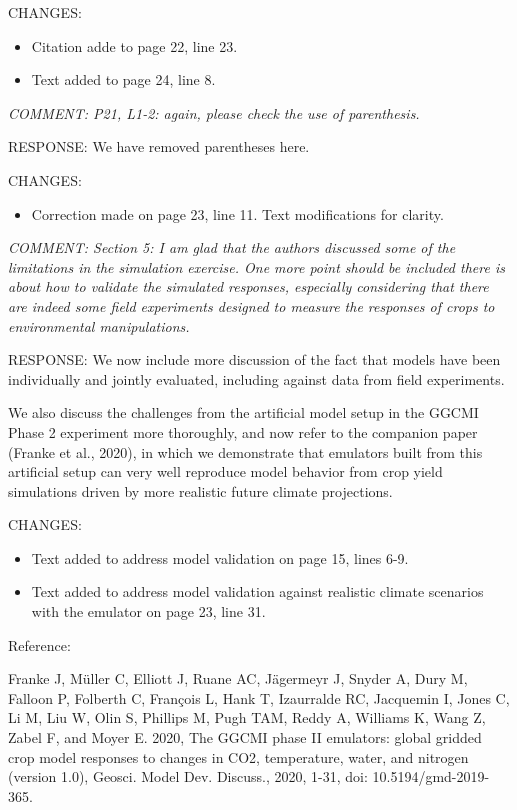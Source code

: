 \documentclass[gmd, manuscript]{copernicus} %
\begin{document}
CHANGES:
\begin{itemize}
    \item Citation adde to page 22, line 23.
    \item Text added to page 24, line 8.
\end{itemize}

\smallskip

\textcolor{dark-gray}{\textit{COMMENT: P21, L1-2: again, please check the use of parenthesis.}}

RESPONSE: We have removed parentheses here.
\smallskip

CHANGES:
\begin{itemize}
    \item Correction made on page 23, line 11. Text modifications for clarity.
\end{itemize}

\smallskip

\textcolor{dark-gray}{\textit{COMMENT: Section 5: I am glad that the authors discussed some of the limitations in the simulation exercise. One more point should be included there is about how to validate the simulated responses, especially considering that there are indeed some field experiments designed to measure the responses of crops to environmental manipulations.}}

RESPONSE: We now include more discussion of the fact that models have been individually and jointly evaluated, including against data from field experiments. 

We also discuss the challenges from the artificial model setup in the GGCMI Phase 2 experiment more thoroughly, and now refer to the companion paper (Franke et al., 2020), in which we demonstrate that emulators built from this artificial setup can very well reproduce model behavior from crop yield simulations driven by more realistic future climate projections.
\smallskip

CHANGES:
\begin{itemize}
    \item Text added to address model validation on page 15, lines 6-9.
    \item Text added to address model validation against realistic climate scenarios with the emulator on page 23, line 31.
\end{itemize}

\smallskip

Reference:

Franke J, Müller C, Elliott J, Ruane AC, Jägermeyr J, Snyder A, Dury M, Falloon P, Folberth C, François L, Hank T, Izaurralde RC, Jacquemin I, Jones C, Li M, Liu W, Olin S, Phillips M, Pugh TAM, Reddy A, Williams K, Wang Z, Zabel F, and Moyer E. 2020, The GGCMI phase II emulators: global gridded crop model responses to changes in CO2, temperature, water, and nitrogen (version 1.0), Geosci. Model Dev. Discuss., 2020, 1-31, doi: 10.5194/gmd-2019-365.
\end{document}
